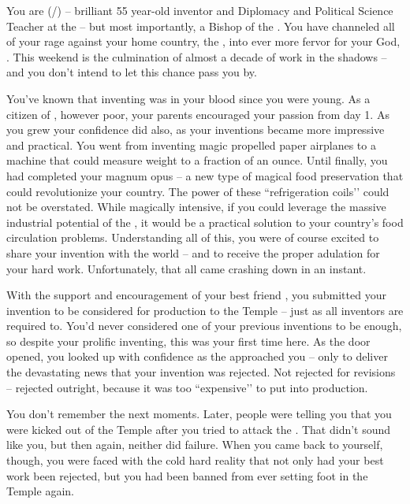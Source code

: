 \documentclass[char]{GL2020}
\begin{document}
\name{\cChupInventor{}}


You are \cChupInventor{\full} (\cChupInventor{\they}/\cChupInventor{\them}) -- brilliant 55 year-old inventor and Diplomacy and Political Science Teacher at the \pSchool{} -- but most importantly, a Bishop of the \pGoaties{}. You have channeled all of your rage against your home country, the \pTech{}, into ever more fervor for your God, \cGenesis{}. This weekend is the culmination of almost a decade of work in the shadows -- and you don’t intend to let this chance pass you by.

You’ve known that inventing was in your blood since you were young. As a citizen of \pTech{}, however poor, your parents encouraged your passion from day 1. As you grew your confidence did also, as your inventions became more impressive and practical. You went from inventing magic propelled paper airplanes to a machine that could measure weight to a fraction of an ounce. Until finally, you had completed your magnum opus -- a new type of magical food preservation that could revolutionize your country. The power of these ``refrigeration coils’’ could not be overstated. While magically intensive, if you could leverage the massive industrial potential of the \pTech{}, it would be a practical solution to your country’s food circulation problems. Understanding all of this, you were of course excited to share your invention with the world -- and to receive the proper adulation for your hard work. Unfortunately, that all came crashing down in an instant.

With the support and encouragement of your best friend \cHeadScientist{}, you submitted your invention to be considered for production to the Temple -- just as all inventors are required to. You’d never considered one of your previous inventions to be enough, so despite your prolific inventing, this was your first time here. As the door opened, you looked up with confidence as the \cAntiChup{\cleric} approached you -- only to deliver the devastating news that your invention was rejected. Not rejected for revisions -- rejected outright, because it was too ``expensive’’ to put into production. 

You don’t remember the next moments. Later, people were telling you that you were kicked out of the Temple after you tried to attack the \cAntiChup{\cleric}. That didn’t sound like you, but then again, neither did failure. When you came back to yourself, though, you were faced with the cold hard reality that not only had your best work been rejected, but you had been banned from ever setting foot in the Temple again.
\end{document}
